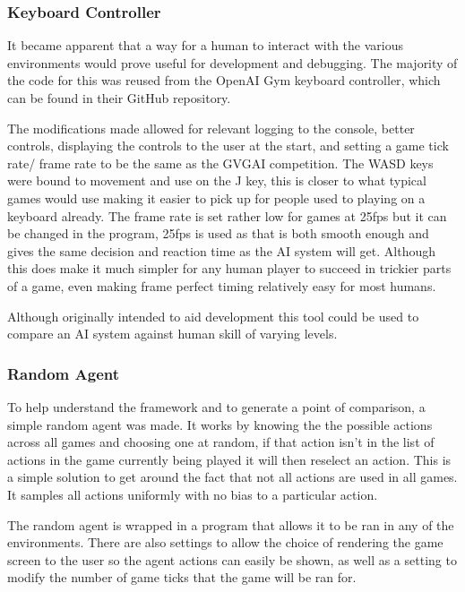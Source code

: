 \documentclass[a4paper]{article}
\begin{document}
\subsubsection{Keyboard Controller}
It became apparent that a way for a human to interact with the various environments would prove useful for development and debugging.
The majority of the code for this was reused from the OpenAI Gym keyboard controller\cite{OpenAIGym}, which can be found in their GitHub repository.
\par
The modifications made allowed for relevant logging to the console, better controls, displaying the controls to the user at the start, and setting a game tick rate/ frame rate to be the same as the GVGAI competition.
The WASD keys were bound to movement and use on the J key, this is closer to what typical games would use making it easier to pick up for people used to playing on a keyboard already.
The frame rate is set rather low for games at 25fps but it can be changed in the program, 25fps is used as that is both smooth enough and gives the same decision and reaction time as the AI system will get.
Although this does make it much simpler for any human player to succeed in trickier parts of a game, even making frame perfect timing relatively easy for most humans.
\par
Although originally intended to aid development this tool could be used to compare an AI system against human skill of varying levels.

\subsubsection{Random Agent}
To help understand the framework and to generate a point of comparison, a simple random agent was made.
It works by knowing the the possible actions across all games and choosing one at random, if that action isn't in the list of actions in the game currently being played it will then reselect an action.
This is a simple solution to get around the fact that not all actions are used in all games.
It samples all actions uniformly with no bias to a particular action.
\par
The random agent is wrapped in a program that allows it to be ran in any of the environments.
There are also settings to allow the choice of rendering the game screen to the user so the agent actions can easily be shown, as well as a setting to modify the number of game ticks that the game will be ran for.
\end{document}
